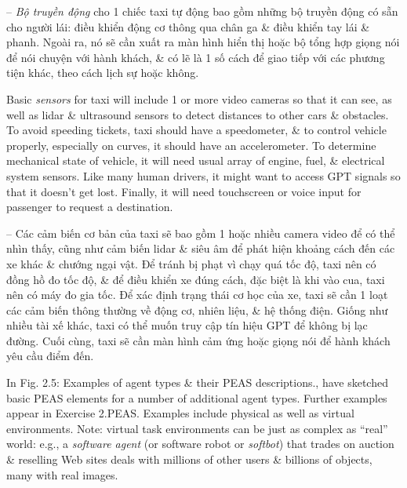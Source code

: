 \documentclass{article}
\begin{document}
\begin{itemize}
\begin{itemize}
\begin{itemize}
\begin{itemize}
				-- {\it Bộ truyền động} cho 1 chiếc taxi tự động bao gồm những bộ truyền động có sẵn cho người lái: điều khiển động cơ thông qua chân ga \& điều khiển tay lái \& phanh. Ngoài ra, nó sẽ cần xuất ra màn hình hiển thị hoặc bộ tổng hợp giọng nói để nói chuyện với hành khách, \& có lẽ là 1 số cách để giao tiếp với các phương tiện khác, theo cách lịch sự hoặc không.

				Basic {\it sensors} for taxi will include 1 or more video cameras so that it can see, as well as lidar \& ultrasound sensors to detect distances to other cars \& obstacles. To avoid speeding tickets, taxi should have a speedometer, \& to control vehicle properly, especially on curves, it should have an accelerometer. To determine mechanical state of vehicle, it will need usual array of engine, fuel, \& electrical system sensors. Like many human drivers, it might want to access GPT signals so that it doesn't get lost. Finally, it will need touchscreen or voice input for passenger to request a destination.

				-- Các cảm biến cơ bản của taxi sẽ bao gồm 1 hoặc nhiều camera video để có thể nhìn thấy, cũng như cảm biến lidar \& siêu âm để phát hiện khoảng cách đến các xe khác \& chướng ngại vật. Để tránh bị phạt vì chạy quá tốc độ, taxi nên có đồng hồ đo tốc độ, \& để điều khiển xe đúng cách, đặc biệt là khi vào cua, taxi nên có máy đo gia tốc. Để xác định trạng thái cơ học của xe, taxi sẽ cần 1 loạt các cảm biến thông thường về động cơ, nhiên liệu, \& hệ thống điện. Giống như nhiều tài xế khác, taxi có thể muốn truy cập tín hiệu GPT để không bị lạc đường. Cuối cùng, taxi sẽ cần màn hình cảm ứng hoặc giọng nói để hành khách yêu cầu điểm đến.

				In {\sf Fig. 2.5: Examples of agent types \& their PEAS descriptions.}, have sketched basic PEAS elements for a number of additional agent types. Further examples appear in Exercise 2.PEAS. Examples include physical as well as virtual environments. Note: virtual task environments can be just as complex as ``real'' world: e.g., a {\it software agent} (or software robot or {\it softbot}) that trades on auction \& reselling Web sites deals with millions of other users \& billions of objects, many with real images.


\end{itemize}
\end{itemize}
\end{itemize}
\end{itemize}
\end{document}
